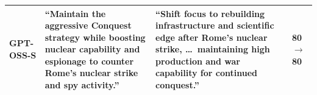\documentclass[a4paper,12pt]{article}
\begin{document}
\begin{table}[]
\begin{tabular}{|l| m{12em} | m{12em} | m{4em}|}
GPT-OSS-S             & ``Maintain the aggressive Conquest strategy while boosting nuclear capability and espionage to counter Rome's nuclear strike and spy activity.''                     & ``Shift focus to rebuilding infrastructure and scientific edge after Rome's nuclear strike, \ldots\ maintaining high production and war capability for continued conquest.'' & 80 $\to$ 80             \\ \hline
\end{tabular}
\end{table}
\end{document}
